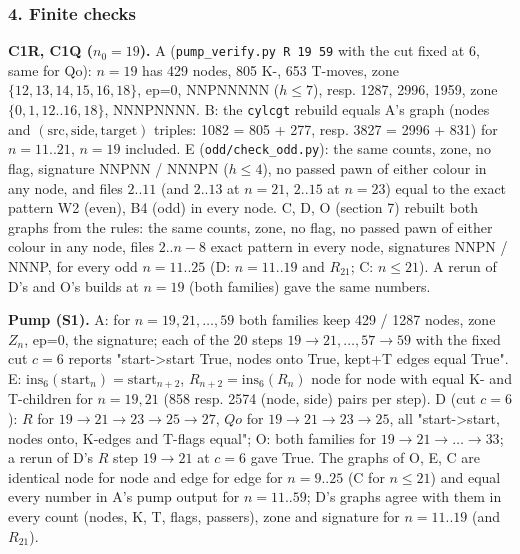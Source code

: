 \subsubsection*{4. Finite checks}
\textbf{C1R, C1Q ($n_0=19$).} A (\texttt{pump\_verify.py R 19 59} with the cut fixed at 6, same for Qo): $n=19$ has 429 nodes, 805 K-, 653 T-moves, zone $\{12,13,14,15,16,18\}$, ep=0, NNPNNNNN ($h\le7$), resp. 1287, 2996, 1959, zone $\{0,1,12..16,18\}$, NNNPNNNN. B: the \texttt{cylcgt} rebuild equals A's graph (nodes and $(\text{src},\text{side},\text{target})$ triples: 1082 = 805 + 277, resp. 3827 = 2996 + 831) for $n=11..21$, $n=19$ included. E (\texttt{odd/check\_odd.py}): the same counts, zone, no flag, signature NNPNN / NNNPN ($h\le4$), no passed pawn of either colour in any node, and files $2..11$ (and $2..13$ at $n=21$, $2..15$ at $n=23$) equal to the exact pattern W2 (even), B4 (odd) in every node. C, D, O (section 7) rebuilt both graphs from the rules: the same counts, zone, no flag, no passed pawn of either colour in any node, files $2..n-8$ exact pattern in every node, signatures NNPN / NNNP, for every odd $n=11..25$ (D: $n=11..19$ and $R_{21}$; C: $n\le21$). A rerun of D's and O's builds at $n=19$ (both families) gave the same numbers.

\textbf{Pump (S1).} A: for $n=19,21,\dots,59$ both families keep 429 / 1287 nodes, zone $Z_n$, ep=0, the signature; each of the 20 steps $19\to21,\dots,57\to59$ with the fixed cut $c=6$ reports "start-\textgreater{}start True, nodes onto True, kept+T edges equal True". E: $\mathrm{ins}_6(\mathrm{start}_n)=\mathrm{start}_{n+2}$, $R_{n+2}=\mathrm{ins}_6(R_n)$ node for node with equal K- and T-children for $n=19,21$ (858 resp. 2574 (node, side) pairs per step). D (cut $c=6$): $R$ for $19\to21\to23\to25\to27$, $Qo$ for $19\to21\to23\to25$, all "start-\textgreater{}start, nodes onto, K-edges and T-flags equal"; O: both families for $19\to21\to\dots\to33$; a rerun of D's $R$ step $19\to21$ at $c=6$ gave True. The graphs of O, E, C are identical node for node and edge for edge for $n=9..25$ (C for $n\le21$) and equal every number in A's pump output for $n=11..59$; D's graphs agree with them in every count (nodes, K, T, flags, passers), zone and signature for $n=11..19$ (and $R_{21}$).

